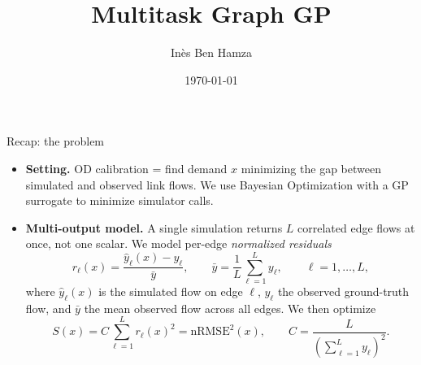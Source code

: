 \documentclass[11pt]{beamer}
\title[Shared+Private GP]{Multitask Graph GP}
\author[I. Ben Hamza]{In\`es Ben Hamza}
\date[\today]{\today}
\begin{document}
\begin{frame}
\titlepage
\end{frame}




\begin{frame}{Recap: the problem}
\begin{itemize}
    \item \textbf{Setting.} OD calibration = find demand $x$ minimizing
    the gap between simulated and observed link flows. We use Bayesian Optimization with a GP
    surrogate to minimize simulator calls.
    \item \textbf{Multi-output model.} A single simulation returns $L$
    correlated edge flows at once, not one scalar. We model per-edge
    \emph{normalized residuals}
    \[
        r_\ell(x) = \frac{\hat{y}_\ell(x) - y_\ell}{\bar{y}},
        \qquad \bar{y} = \frac{1}{L}\sum_{\ell=1}^L y_\ell,
        \qquad \ell = 1,\dots,L,
    \]
    where $\hat{y}_\ell(x)$ is the simulated flow on edge $\ell$,
    $y_\ell$ the observed ground-truth flow, and $\bar{y}$ the mean
    observed flow across all edges. We then optimize
    \[
        S(x) = C \sum_{\ell=1}^L r_\ell(x)^2 = \text{nRMSE}^2(x),
        \qquad
        C = \frac{L}{\left(\sum_{\ell=1}^L y_\ell\right)^2}.
    \]
\end{itemize}
\end{frame}
\end{document}

